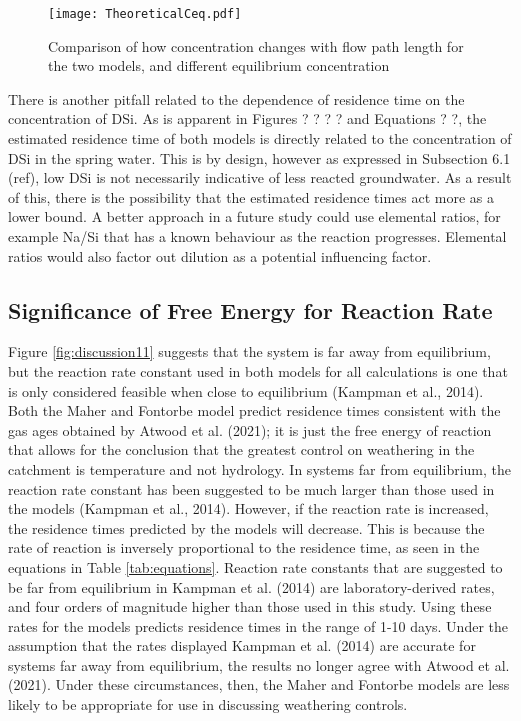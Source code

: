 \begin{figure}[h]
    \centering
    \texttt{[image: TheoreticalCeq.pdf]}
    \caption{Comparison of how concentration changes with flow path length for the two models, and different equilibrium concentration}
    \label{fig:discussion8}
\end{figure}

\FloatBarrier

There is another pitfall related to the dependence of residence time on the concentration of DSi. As is apparent in Figures ? ? ? ? and Equations ? ?, the estimated residence time of both models is directly related to the concentration of DSi in the spring water. This is by design, however as expressed in Subsection 6.1 (ref), low DSi is not necessarily indicative of less reacted groundwater. As a result of this, there is the possibility that the estimated residence times act more as a lower bound. A better approach in a future study could use elemental ratios, for example Na/Si that has a known behaviour as the reaction progresses. Elemental ratios would also factor out dilution as a potential influencing factor.



\newpage


\subsection{Significance of Free Energy for Reaction Rate}

Figure \ref{fig:discussion11} suggests that the system is far away from equilibrium, but the reaction rate constant used in both models for all calculations is one that is only considered feasible when close to equilibrium (Kampman et al., 2014). Both the Maher and Fontorbe model predict residence times consistent with the gas ages obtained by Atwood et al. (2021); it is just the free energy of reaction that allows for the conclusion that the greatest control on weathering in the catchment is temperature and not hydrology. In systems far from equilibrium, the reaction rate constant has been suggested to be much larger than those used in the models (Kampman et al., 2014). However, if the reaction rate is increased, the residence times predicted by the models will decrease. This is because the rate of reaction is inversely proportional to the residence time, as seen in the equations in Table \ref{tab:equations}. Reaction rate constants that are suggested to be far from equilibrium in Kampman et al. (2014) are laboratory-derived rates, and four orders of magnitude higher than those used in this study. Using these rates for the models predicts residence times in the range of 1-10 days. Under the assumption that the rates displayed Kampman et al. (2014) are accurate for systems far away from equilibrium, the results no longer agree with Atwood et al. (2021). Under these circumstances, then, the Maher and Fontorbe models are less likely to be appropriate for use in discussing weathering controls. 

